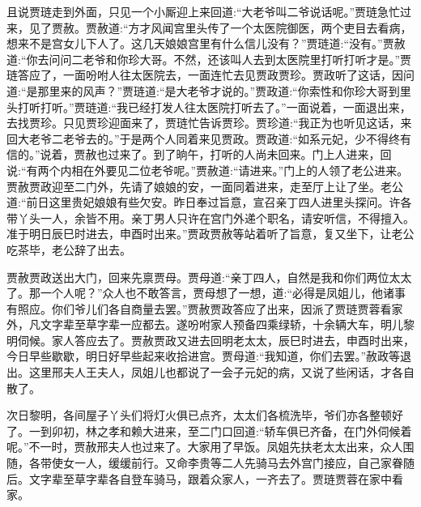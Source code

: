 \begin{parag}
    且说贾琏走到外面，只见一个小厮迎上来回道:“大老爷叫二爷说话呢。”贾琏急忙过来，见了贾赦。贾赦道:“方才风闻宫里头传了一个太医院御医，两个吏目去看病，想来不是宫女儿下人了。这几天娘娘宫里有什么信儿没有？”贾琏道:“没有。”贾赦道:“你去问问二老爷和你珍大哥。不然，还该叫人去到太医院里打听打听才是。”贾琏答应了，一面吩咐人往太医院去，一面连忙去见贾政贾珍。贾政听了这话，因问道:“是那里来的风声？”贾琏道:“是大老爷才说的。”贾政道:“你索性和你珍大哥到里头打听打听。”贾琏道:“我已经打发人往太医院打听去了。”一面说着，一面退出来，去找贾珍。只见贾珍迎面来了，贾琏忙告诉贾珍。贾珍道:“我正为也听见这话，来回大老爷二老爷去的。”于是两个人同着来见贾政。贾政道:“如系元妃，少不得终有信的。”说着，贾赦也过来了。到了晌午，打听的人尚未回来。门上人进来，回说:“有两个内相在外要见二位老爷呢。”贾赦道:“请进来。”门上的人领了老公进来。贾赦贾政迎至二门外，先请了娘娘的安，一面同着进来，走至厅上让了坐。老公道:“前日这里贵妃娘娘有些欠安。昨日奉过旨意，宣召亲丁四人进里头探问。许各带丫头一人，余皆不用。亲丁男人只许在宫门外递个职名，请安听信，不得擅入。准于明日辰巳时进去，申酉时出来。”贾政贾赦等站着听了旨意，复又坐下，让老公吃茶毕，老公辞了出去。
\end{parag}


\begin{parag}
    贾赦贾政送出大门，回来先禀贾母。贾母道:“亲丁四人，自然是我和你们两位太太了。那一个人呢？”众人也不敢答言，贾母想了一想，道:“必得是凤姐儿，他诸事有照应。你们爷儿们各自商量去罢。”贾赦贾政答应了出来，因派了贾琏贾蓉看家外，凡文字辈至草字辈一应都去。遂吩咐家人预备四乘绿轿，十余辆大车，明儿黎明伺候。家人答应去了。贾赦贾政又进去回明老太太，辰巳时进去，申酉时出来，今日早些歇歇，明日好早些起来收拾进宫。贾母道:“我知道，你们去罢。”赦政等退出。这里邢夫人王夫人，凤姐儿也都说了一会子元妃的病，又说了些闲话，才各自散了。
\end{parag}


\begin{parag}
    次日黎明，各间屋子丫头们将灯火俱已点齐，太太们各梳洗毕，爷们亦各整顿好了。一到卯初，林之孝和赖大进来，至二门口回道:“轿车俱已齐备，在门外伺候着呢。”不一时，贾赦邢夫人也过来了。大家用了早饭。凤姐先扶老太太出来，众人围随，各带使女一人，缓缓前行。又命李贵等二人先骑马去外宫门接应，自己家眷随后。文字辈至草字辈各自登车骑马，跟着众家人，一齐去了。贾琏贾蓉在家中看家。
\end{parag}


